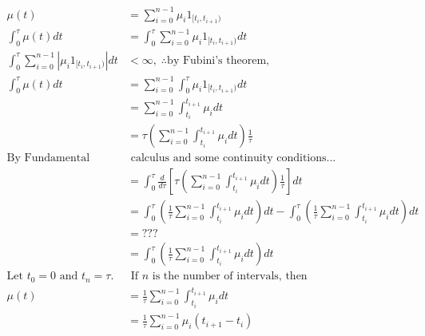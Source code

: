 \documentclass[
]{book}
\begin{document}
\begin{equation}
\begin{aligned}

\mu(t) &= \sum_{i=0}^{n-1} \mu_i 1_{[t_i,t_{i+1})} \\

\int_0^\tau \mu(t) dt &= \int_0^\tau \sum_{i=0}^{n-1} \mu_i 1_{[t_i,t_{i+1})} dt \\

\int_0^\tau \sum_{i=0}^{n-1} |\mu_i 1_{[t_i,t_{i+1})}| dt &< \infty, \; \therefore \text{by Fubini's theorem,} \\

\int_0^\tau \mu(t) dt &= \sum_{i=0}^{n-1} \int_0^\tau \mu_i 1_{[t_i,t_{i+1})} dt \\

&= \sum_{i=0}^{n-1} \int_{t_i}^{t_{i+1}} \mu_i dt \\

&= \tau \left( \sum_{i=0}^{n-1} \int_{t_i}^{t_{i+1}} \mu_i dt \right) \frac{1}{\tau} \\

\text{By Fundamental theorem of} &\text{ calculus and some continuity conditions...} \\

&= \int_0^\tau \frac{d}{d\tau} \left[ \tau \left( \sum_{i=0}^{n-1} \int_{t_i}^{t_{i+1}} \mu_i dt \right) \frac{1}{\tau} \right] dt \\

&= \int_0^\tau \left( \frac{1}{\tau} \sum_{i=0}^{n-1} \int_{t_i}^{t_{i+1}} \mu_i dt \right) dt - \int_0^\tau \left( \frac{1}{\tau} \sum_{i=0}^{n-1} \int_{t_i}^{t_{i+1}} \mu_i dt \right) dt \\

&= ??? \\

&= \int_0^\tau \left( \frac{1}{\tau} \sum_{i=0}^{n-1} \int_{t_i}^{t_{i+1}} \mu_i dt \right) dt \\

\text{Let } t_0=0 \text{ and } t_n=\tau. &\text{ If } n \text{ is the number of intervals, then} \\

\mu(t) &= \frac{1}{\tau} \sum_{i=0}^{n-1} \int_{t_i}^{t_{i+1}} \mu_i dt \\

&= \frac{1}{\tau} \sum_{i=0}^{n-1} \mu_i (t_{i+1}-t_i)

\end{aligned}
\end{equation}
\end{document}
